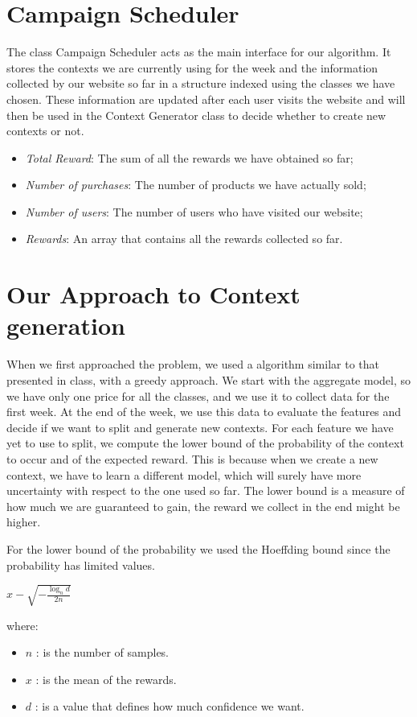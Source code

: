 \section{Campaign Scheduler}\label{sec:campaign-scheduler}
The class Campaign Scheduler acts as the main interface for our algorithm.
It stores the contexts we are currently using for the week and the information collected by our website so far in a structure indexed using the classes we have chosen.
These information are updated after each user visits the website and will then be used in the Context Generator class to decide whether to create new contexts or not.
\begin{itemize}
	\item \textit{Total Reward}: The sum of all the rewards we have obtained so far;
	\item \textit{Number of purchases}: The number of products we have actually sold;
	\item \textit{Number of users}: The number of users who have visited our website;
    \item \textit{Rewards}: An array that contains all the rewards collected so far.
\end{itemize}

\section{Our Approach to Context generation}\label{sec:our-approach-to-context-generation}
When we first approached the problem, we used a algorithm similar to that presented in class, with a greedy approach.
We start with the aggregate model, so we have only one price for all the classes, and we use it to collect data for the first week.
At the end of the week, we use this data to evaluate the features and decide if we want to split and generate new contexts.
For each feature we have yet to use to split, we compute the lower bound of the probability of the context to occur and of the expected reward.
This is because when we create a new context, we have to learn a different model, which will surely have more uncertainty with respect to the one used so far.
The lower bound is a measure of how much we are guaranteed to gain, the reward we collect in the end might be higher.

	For the lower bound of the probability we used the Hoeffding bound since the probability has limited values.

\begin{center}$x - \sqrt{-\frac{\log_n{d}} {2 n}}$\end{center}
where:
\begin{itemize}
	\item $n$ : is the number of samples.
	\item $x$ : is the mean of the rewards.
	\item $d$ : is a value that defines how much confidence we want.
\end{itemize}

